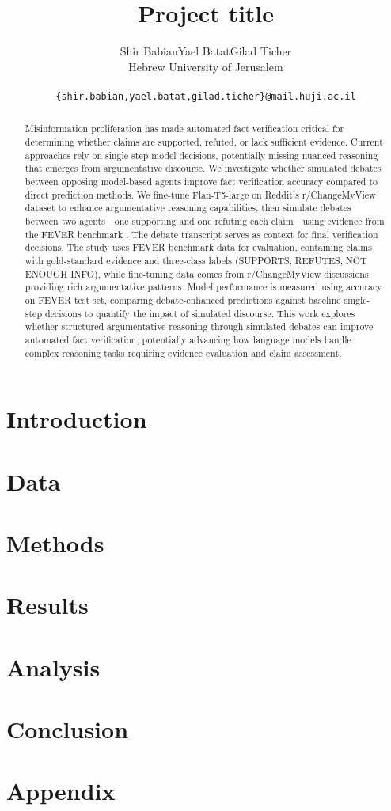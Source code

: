 \documentclass[11pt]{article}
\title{Project title}
\author{
    Shir Babian\qquad Yael Batat\qquad Gilad Ticher \\
    Hebrew University of Jerusalem \\\\
  \texttt{\{shir.babian,yael.batat,gilad.ticher\}@mail.huji.ac.il} \\}
\begin{document}
\maketitle
\begin{abstract}
Misinformation proliferation has made automated fact verification critical for determining whether claims are supported, refuted, or lack sufficient evidence. Current approaches rely on single-step model decisions, potentially missing nuanced reasoning that emerges from argumentative discourse. We investigate whether simulated debates between opposing model-based agents improve fact verification accuracy compared to direct prediction methods. We fine-tune Flan-T5-large \cite{t5} on Reddit's r/ChangeMyView dataset \cite{winarg} to enhance argumentative reasoning capabilities, then simulate debates between two agents—one supporting and one refuting each claim—using evidence from the FEVER benchmark \cite{FEVER}. The debate transcript serves as context for final verification decisions. The study uses FEVER benchmark data for evaluation, containing claims with gold-standard evidence and three-class labels (SUPPORTS, REFUTES, NOT ENOUGH INFO), while fine-tuning data comes from r/ChangeMyView discussions providing rich argumentative patterns. Model performance is measured using accuracy on FEVER test set, comparing debate-enhanced predictions against baseline single-step decisions to quantify the impact of simulated discourse. This work explores whether structured argumentative reasoning through simulated debates can improve automated fact verification, potentially advancing how language models handle complex reasoning tasks requiring evidence evaluation and claim assessment.
\end{abstract}

\section{Introduction}

\section{Data}

\section{Methods}

\section{Results}

\section{Analysis}

\section{Conclusion}




\appendix

\section{Appendix}
\end{document}
